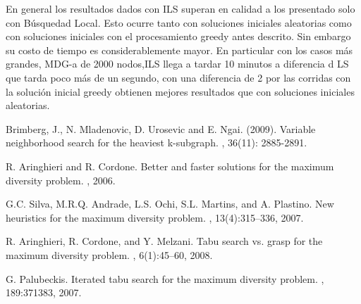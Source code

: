 \documentclass{ci5652}
\begin{document}
En general los resultados dados con ILS superan en calidad a los presentado solo con Búsquedad Local.
Esto ocurre tanto con soluciones iniciales aleatorias como con soluciones iniciales con el procesamiento
greedy antes descrito. Sin embargo su costo de tiempo es considerablemente mayor. En particular con los casos
más grandes, MDG-a de 2000 nodos,ILS llega a tardar 10 minutos a diferencia d LS que tarda poco más de un segundo,
con una diferencia de 2%
por las corridas con la solución inicial greedy obtienen mejores resultados que con soluciones iniciales
aleatorias.




\small


\begin{thebibliography}{99}

Brimberg, J., N. Mladenovic, D. Urosevic and E. Ngai. (2009).
\newblock Variable neighborhood search for the heaviest k-subgraph.
, 36(11): 2885-2891.

R. Aringhieri and R. Cordone.
\newblock Better and faster solutions for the maximum diversity problem.
, 2006.

G.C. Silva, M.R.Q. Andrade, L.S. Ochi, S.L. Martins, and A. Plastino.
\newblock New heuristics for the maximum diversity problem.
, 13(4):315–336, 2007.

R. Aringhieri, R. Cordone, and Y. Melzani.
\newblock Tabu search vs. grasp for the maximum diversity problem.
, 6(1):45–60, 2008.

G. Palubeckis.
\newblock Iterated tabu search for the maximum diversity problem.
, 189:371383, 2007.




\end{thebibliography}
\end{document}
